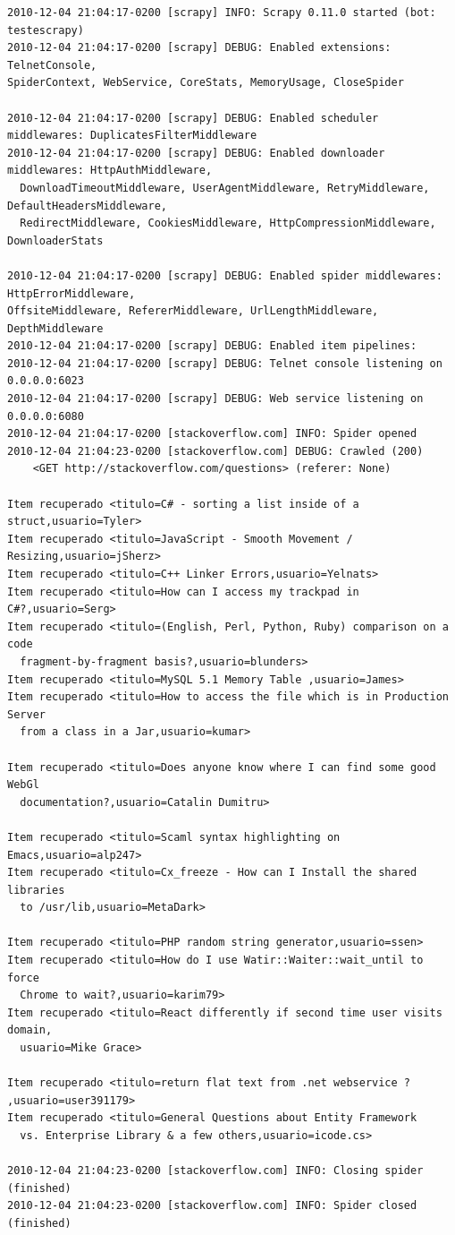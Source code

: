 \begin{lstlisting}[label=out_stack]
2010-12-04 21:04:17-0200 [scrapy] INFO: Scrapy 0.11.0 started (bot: testescrapy)
2010-12-04 21:04:17-0200 [scrapy] DEBUG: Enabled extensions: TelnetConsole, 
SpiderContext, WebService, CoreStats, MemoryUsage, CloseSpider

2010-12-04 21:04:17-0200 [scrapy] DEBUG: Enabled scheduler middlewares: DuplicatesFilterMiddleware
2010-12-04 21:04:17-0200 [scrapy] DEBUG: Enabled downloader middlewares: HttpAuthMiddleware, 
  DownloadTimeoutMiddleware, UserAgentMiddleware, RetryMiddleware, DefaultHeadersMiddleware, 
  RedirectMiddleware, CookiesMiddleware, HttpCompressionMiddleware, DownloaderStats
  
2010-12-04 21:04:17-0200 [scrapy] DEBUG: Enabled spider middlewares: HttpErrorMiddleware, 
OffsiteMiddleware, RefererMiddleware, UrlLengthMiddleware, DepthMiddleware
2010-12-04 21:04:17-0200 [scrapy] DEBUG: Enabled item pipelines: 
2010-12-04 21:04:17-0200 [scrapy] DEBUG: Telnet console listening on 0.0.0.0:6023
2010-12-04 21:04:17-0200 [scrapy] DEBUG: Web service listening on 0.0.0.0:6080
2010-12-04 21:04:17-0200 [stackoverflow.com] INFO: Spider opened
2010-12-04 21:04:23-0200 [stackoverflow.com] DEBUG: Crawled (200) 
    <GET http://stackoverflow.com/questions> (referer: None)
    
Item recuperado <titulo=C# - sorting a list inside of a struct,usuario=Tyler>
Item recuperado <titulo=JavaScript - Smooth Movement / Resizing,usuario=jSherz>
Item recuperado <titulo=C++ Linker Errors,usuario=Yelnats>
Item recuperado <titulo=How can I access my trackpad in C#?,usuario=Serg>
Item recuperado <titulo=(English, Perl, Python, Ruby) comparison on a code 
  fragment-by-fragment basis?,usuario=blunders>
Item recuperado <titulo=MySQL 5.1 Memory Table ,usuario=James>
Item recuperado <titulo=How to access the file which is in Production Server 
  from a class in a Jar,usuario=kumar>

Item recuperado <titulo=Does anyone know where I can find some good WebGl 
  documentation?,usuario=Catalin Dumitru>
  
Item recuperado <titulo=Scaml syntax highlighting on Emacs,usuario=alp247>
Item recuperado <titulo=Cx_freeze - How can I Install the shared libraries 
  to /usr/lib,usuario=MetaDark>
  
Item recuperado <titulo=PHP random string generator,usuario=ssen>
Item recuperado <titulo=How do I use Watir::Waiter::wait_until to force
  Chrome to wait?,usuario=karim79>
Item recuperado <titulo=React differently if second time user visits domain,
  usuario=Mike Grace>
  
Item recuperado <titulo=return flat text from .net webservice ? ,usuario=user391179>
Item recuperado <titulo=General Questions about Entity Framework 
  vs. Enterprise Library & a few others,usuario=icode.cs>
  
2010-12-04 21:04:23-0200 [stackoverflow.com] INFO: Closing spider (finished)
2010-12-04 21:04:23-0200 [stackoverflow.com] INFO: Spider closed (finished)
\end{lstlisting}

